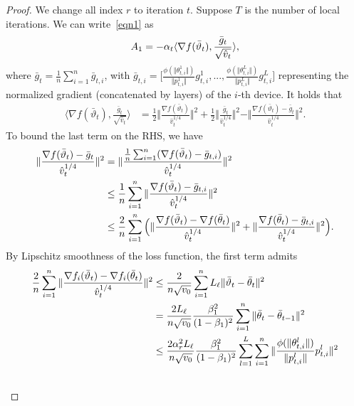 \documentclass[twoside]{article}
\begin{document}
\begin{proof}
We change all index $r$ to iteration $t$. 
Suppose $T$ is the number of local iterations. We can write~\eqref{eqn1} as
\begin{align}\notag
    A_1=-\alpha_t \langle \nabla f(\bar \vartheta_t),\frac{\bar g_t}{\sqrt{\hat v_t}} \rangle,
\end{align}
where $\bar g_t=\frac{1}{n}\sum_{i=1}^n \bar g_{t,i}$, with $\bar g_{t,i}=\Big[\frac{\phi(\Vert \theta_{t,i}^1\Vert)}{\Vert p_{t,i}^1\Vert}g_{t,i}^1,..., \frac{\phi(\Vert \theta_{t,i}^L\Vert)}{\Vert p_{t,i}^L\Vert}g_{t,i}^L   \Big]$ representing the normalized gradient (concatenated by layers) of the $i$-th device. It holds that
\begin{align}
    \langle \nabla f(\bar \vartheta_t),\frac{\bar g_t}{\sqrt{\hat v_t}} \rangle&=\frac{1}{2}\Vert \frac{\nabla f(\bar\vartheta_t) }{\hat v_t^{1/4}}\Vert^2+\frac{1}{2}\Vert \frac{\bar g_t }{\hat v_t^{1/4}}\Vert^2-\Vert \frac{\nabla f(\bar\vartheta_t)-\bar g_t }{\hat v_t^{1/4}}\Vert^2.  \label{eqn:x1}
\end{align}
To bound the last term on the RHS, we have
\begin{align}\notag
    \Vert \frac{\nabla f(\bar\vartheta_t)-\bar g_t }{\hat v_t^{1/4}}\Vert^2&=\Vert \frac{\frac{1}{n}\sum_{i=1}^n (\nabla f(\bar\vartheta_t)-\bar g_{t,i})}{\hat v_t^{1/4}} \Vert^2\\\notag
    &\leq \frac{1}{n}\sum_{i=1}^n\Vert \frac{\nabla f(\bar\vartheta_t)-\bar g_{t,i}}{\hat v_t^{1/4}} \Vert^2\\\notag
    &\leq \frac{2}{n}\sum_{i=1}^n \Big(\Vert \frac{\nabla f(\bar\vartheta_t)-\nabla f(\bar\theta_t)}{\hat v_t^{1/4}} \Vert^2+\Vert \frac{\nabla f(\bar\theta_t)-\bar g_{t,i}}{\hat v_t^{1/4}} \Vert^2  \Big). 
\end{align}
By Lipschitz smoothness of the loss function, the first term admits
\begin{align}\notag
    \frac{2}{n}\sum_{i=1}^n\Vert \frac{\nabla f_i(\bar\vartheta_t)-\nabla f_i(\bar\theta_t)}{\hat v_t^{1/4}} \Vert^2&\leq \frac{2}{n \sqrt{v_0}}\sum_{i=1}^n L_\ell\Vert \bar\vartheta_t-\bar\theta_t\Vert^2  \\\notag
    &=\frac{2L_\ell}{n \sqrt{v_0}}\frac{\beta_1^2}{(1-\beta_1)^2}\sum_{i=1}^n \Vert \bar\theta_t-\bar\theta_{t-1}\Vert ^2\\\notag
    &\leq \frac{2\alpha_r^2 L_\ell }{n \sqrt{v_0}}\frac{\beta_1^2}{(1-\beta_1)^2} \sum_{l=1}^L \sum_{i=1}^n\Vert \frac{\phi(\Vert \theta_{t,i}^l\Vert)}{\Vert p_{t,i}^l\Vert}p_{t,i}^l \Vert^2\\\notag

\end{align}
\end{proof}
\end{document}
